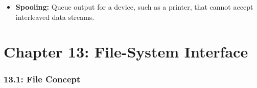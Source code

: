 \documentclass[12pt]{article}
\begin{document}
\begin{itemize}
    \item \textbf{Spooling:} Queue output for a device, such as a printer, that cannot accept interleaved data streams.
\end{itemize}

\part*{Chapter 13: File-System Interface}

\section*{13.1: File Concept}
\end{document}
